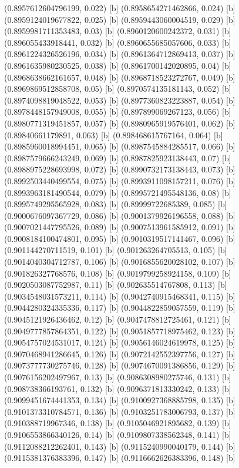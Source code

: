 {{{(0.8957612604796199, 0.022) [b] 
(0.8958654271462866, 0.024) [b] 
(0.8959124019677822, 0.025) [b] 
(0.8959443060004519, 0.029) [b] 
(0.8959981711353483, 0.03) [b] 
(0.8960120600242372, 0.031) [b] 
(0.896055433918441, 0.032) [b] 
(0.8960655685057606, 0.033) [b] 
(0.8961224326526196, 0.034) [b] 
(0.8961364712869413, 0.037) [b] 
(0.8961635980230525, 0.038) [b] 
(0.8961700142020895, 0.04) [b] 
(0.8968638662161657, 0.048) [b] 
(0.8968718523272767, 0.049) [b] 
(0.8969869512858708, 0.05) [b] 
(0.8970574135181143, 0.052) [b] 
(0.8974098819048522, 0.053) [b] 
(0.8977360823223887, 0.054) [b] 
(0.8978448157949008, 0.055) [b] 
(0.897899069267123, 0.056) [b] 
(0.8980771319451857, 0.057) [b] 
(0.8980965919576401, 0.062) [b] 
(0.89840661179891, 0.063) [b] 
(0.898468615767164, 0.064) [b] 
(0.8985960018994451, 0.065) [b] 
(0.8987545884285517, 0.066) [b] 
(0.8987579666243249, 0.069) [b] 
(0.8987825923138443, 0.07) [b] 
(0.8988975228693998, 0.072) [b] 
(0.8990732173138443, 0.073) [b] 
(0.8992503440499554, 0.075) [b] 
(0.8993911098157211, 0.076) [b] 
(0.8993963181490544, 0.079) [b] 
(0.8995721495548136, 0.08) [b] 
(0.8995749295565928, 0.083) [b] 
(0.89999722685389, 0.085) [b] 
(0.9000676097367729, 0.086) [b] 
(0.9001379926196558, 0.088) [b] 
(0.9007021447795526, 0.089) [b] 
(0.9007513961585912, 0.091) [b] 
(0.9008184100474801, 0.095) [b] 
(0.9010319517141467, 0.096) [b] 
(0.901144270711519, 0.101) [b] 
(0.901263264705513, 0.105) [b] 
(0.9014040304712787, 0.106) [b] 
(0.9016855620028102, 0.107) [b] 
(0.901826327768576, 0.108) [b] 
(0.9019799258924158, 0.109) [b] 
(0.9020503087752987, 0.11) [b] 
(0.902635514767808, 0.113) [b] 
(0.9034548031573211, 0.114) [b] 
(0.9042740915468341, 0.115) [b] 
(0.9044280324335336, 0.117) [b] 
(0.9044822859057559, 0.119) [b] 
(0.9045121926436462, 0.12) [b] 
(0.9047478812725461, 0.121) [b] 
(0.9049777857864351, 0.122) [b] 
(0.9051857718975462, 0.123) [b] 
(0.9054757024531017, 0.124) [b] 
(0.9056146024619978, 0.125) [b] 
(0.9070468941286645, 0.126) [b] 
(0.9072142552397756, 0.127) [b] 
(0.9073777730275746, 0.128) [b] 
(0.9074670091386856, 0.129) [b] 
(0.9076156202497967, 0.13) [b] 
(0.9086308980275746, 0.131) [b] 
(0.908738366193761, 0.132) [b] 
(0.9096371813330242, 0.133) [b] 
(0.9099451674441353, 0.134) [b] 
(0.9100927368885798, 0.135) [b] 
(0.9101373310784571, 0.136) [b] 
(0.9103251783006793, 0.137) [b] 
(0.910388719967346, 0.138) [b] 
(0.9105046921895682, 0.139) [b] 
(0.9106553866340126, 0.14) [b] 
(0.9109807338562348, 0.141) [b] 
(0.9112088212262401, 0.143) [b] 
(0.9115240990040179, 0.144) [b] 
(0.9115381376383396, 0.147) [b] 
(0.9116662626383396, 0.148) [b] 
}}}
